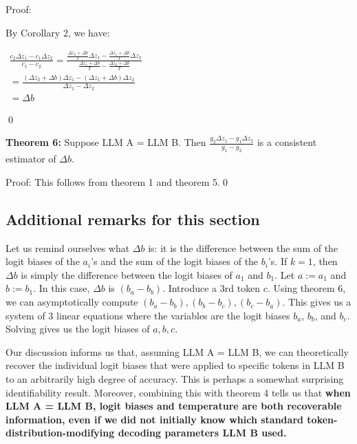 \documentclass{article}
\begin{document}
Proof:

By Corollary 2, we have:

$\displaystyle  \begin{array}{l}
\frac{c_{2} \Delta z_{1} -c_{1} \Delta z_{2}}{c_{1} -c_{2}} =\frac{\frac{\Delta z_{2} +\Delta b}{T} \Delta z_{1} -\frac{\Delta z_{1} +\Delta b}{T} \Delta z_{2}}{\frac{\Delta z_{1} +\Delta b}{T} -\frac{\Delta z_{2} +\Delta b}{T}}\\
=\frac{\left( \Delta z_{2} +\Delta b\right) \Delta z_{1} -\left( \Delta z_{1} +\Delta b\right) \Delta z_{2}}{\Delta z_{1} -\Delta z_{2}}\\
=\Delta b
\end{array}$



\qed 

\textbf{Theorem 6:} Suppose LLM A = LLM B. Then $\displaystyle \frac{g_{2} \Delta z_{1} -g_{1} \Delta z_{2}}{g_{1} -g_{2}}$ is a consistent estimator of $\displaystyle \Delta b$.

Proof: This follows from theorem 1 and theorem 5.\qed 



\subsection{Additional remarks for this section}

Let us remind ourselves what $\displaystyle \Delta b$ is: it is the difference between the sum of the logit biases of the $\displaystyle a_{i}$'s and the sum of the logit biases of the $\displaystyle b_{i}$'s. If $\displaystyle k=1$, then $\displaystyle \Delta b$ is simply the difference between the logit biases of $\displaystyle a_{1}$ and $\displaystyle b_{1}$. Let $\displaystyle a:=a_{1}$ and $\displaystyle b:=b_{1}$. In this case, $\displaystyle \Delta b$ is $\displaystyle \left( b_{a} -b_{b}\right)$. Introduce a 3rd token $\displaystyle c$. Using theorem 6, we can asymptotically compute $\displaystyle \left( b_{a} -b_{b}\right) ,\left( b_{b} -b_{c}\right) ,\left( b_{c} -b_{a}\right)$. This gives us a system of 3 linear equations where the variables are the logit biases $\displaystyle b_{a}$, $\displaystyle b_{b}$, and $\displaystyle b_{c}$. Solving gives us the logit biases of $\displaystyle a,b,c$.



Our discussion informs us that, assuming LLM A = LLM B, we can theoretically recover the individual logit biases that were applied to specific tokens in LLM B to an arbitrarily high degree of accuracy. This is perhaps a somewhat surprising identifiability result. Moreover, combining this with theorem 4 tells us that \textbf{when LLM A = LLM B, logit biases and temperature are both recoverable information, even if we did not initially know which standard token-distribution-modifying decoding parameters LLM B used.}
\end{document}
